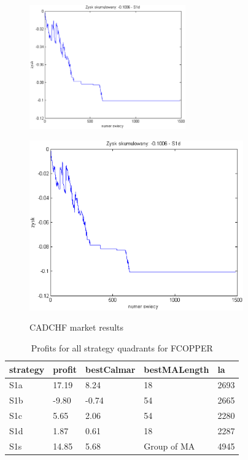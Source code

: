 \documentclass{tewiart}
\begin{document}
\begin{figure}[h]
\begin{minipage}{\linewidth}
\label{cztero}
\end{minipage}
\begin{minipage}{\linewidth}
\centering
\includegraphics[width=0.6\textwidth]{images/cadchfS1d.eps}
\label{mansard}
\end{minipage}
\begin{minipage}{.49\linewidth}
\centering
\includegraphics[width=0.82\textwidth]{images/cadchfS1s.eps}
\label{mansard}
\end{minipage}
\caption{CADCHF market results}
\end{figure}
\newpage
\begin{table}[!t]
\caption{Profits for all strategy quadrants for FCOPPER}
 \begin{center}
 \begin{tabular}{|l|l|l|l|l|}
 \hline \textbf{strategy} & \textbf{profit} & \textbf{bestCalmar} & \textbf{bestMALength} & \textbf{la} \\ \hline
S1a & 17.19 & 8.24 & 18 & 2693\\ \hline
S1b & -9.80 & -0.74 & 54 & 2665\\ \hline
S1c & 5.65 & 2.06 & 54 & 2280\\ \hline
S1d & 1.87 & 0.61 & 18 & 2287\\ \hline
S1s & 14.85 & 5.68 & Group of MA & 4945\\
\hline \end{tabular}
 \end{center}
 \end{table}
\end{document}
